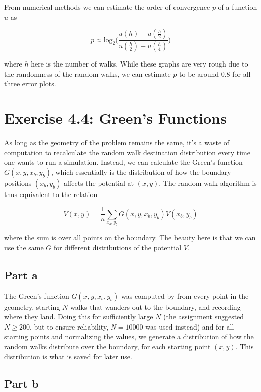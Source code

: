 \documentclass[a4paper,12pt]{article}
\begin{document}
From numerical methods we can estimate the order of convergence $p$ of a function $u$ as

\begin{equation*}
  p \approx \mathrm{log}_{2}\biggl( \frac{u(h) - u(\frac{h}{2})}{u(\frac{h}{2}) - u(\frac{h}{4})} \biggr)
\end{equation*}

where $h$ here is the number of walks. While these graphs are very rough due to the randomness of the random walks,
we can estimate $p$ to be around $0.8$ for all three error plots.

\section*{Exercise 4.4: Green's Functions}

As long as the geometry of the problem remains the same, it's a waste of computation to recalculate the random walk
destination distribution every time one wants to run a simulation. Instead, we can calculate the Green's function
$G(x, y, x_b, y_b)$, which essentially is the distribution of how the boundary positions $(x_b, y_b)$ affects the
potential at $(x, y)$. The random walk algorithm is thus equivalent to the relation

\begin{equation*}
  V(x, y) = \frac{1}{n} \sum_{x_b, y_b} G(x, y, x_b, y_b) V(x_b, y_b)
\end{equation*}

where the sum is over all points on the boundary. The beauty here is that we can use the same $G$ for different
distributions of the potential $V$.

\subsection*{Part a}

The Green's function $G(x, y, x_b, y_b)$ was computed by from every point in the geometry, starting $N$ walks that
wanders out to the boundary, and recording where they land. Doing this for sufficiently large $N$ (the assignment
suggested $N \geq 200$, but to ensure reliability, $N = 10000$ was used instead) and for all starting points and
normalizing the values, we generate a distribution of how the random walks distribute over the boundary, for each
starting point $(x, y)$. This distribution is what is saved for later use.

\subsection*{Part b}
\end{document}
